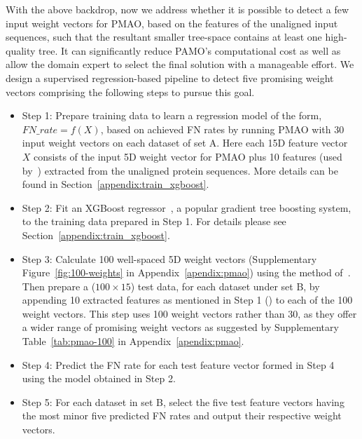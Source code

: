With the above backdrop, now we address whether it is possible to detect a few input weight vectors for PMAO, based on the features of the unaligned input sequences, such that the resultant smaller tree-space contains at least one high-quality tree. It can significantly reduce PAMO's computational cost as well as allow the domain expert to select the final solution with a manageable effort. We design a supervised regression-based pipeline to detect five promising weight vectors comprising the following steps to pursue this goal.
\begin{itemize}
	\item Step 1: Prepare training data to learn a regression model of the form, $FN\_rate = f(X)$, based on achieved FN rates by running PMAO with 30 input weight vectors on each dataset of set A. Here each 15D feature vector $X$ consists of the input 5D weight vector for PMAO plus 10 features (used by~\cite{rubio2018characteristic}) extracted from the unaligned protein sequences. More details can be found in Section~\ref{appendix:train_xgboost}.
	\item Step 2: Fit an XGBoost regressor~\cite{chen2016xgboost}, a popular gradient tree boosting system, to the training data prepared in Step 1. For details please see Section~\ref{appendix:train_xgboost}.
\item Step 3: Calculate 100 well-spaced 5D weight vectors (Supplementary Figure~\ref{fig:100-weights} in Appendix~\ref{apendix:pmao}) using the method of~\cite{ref_dirs_energy}. Then prepare a ($100 \times 15$) test data, for each dataset under set B, by appending 10 extracted features as mentioned in Step 1 (\cite{rubio2018characteristic}) to each of the 100 weight vectors. This step uses 100 weight vectors rather than 30, as they offer a wider range of promising weight vectors as suggested by Supplementary Table~\ref{tab:pmao-100} in Appendix~\ref{apendix:pmao}.
	\item Step 4: Predict the FN rate for each test feature vector formed in Step 4 using the model obtained in Step 2.
	\item Step 5: For each dataset in set B, select the five test feature vectors having the most minor five predicted FN rates and output their respective weight vectors.
\end{itemize}

